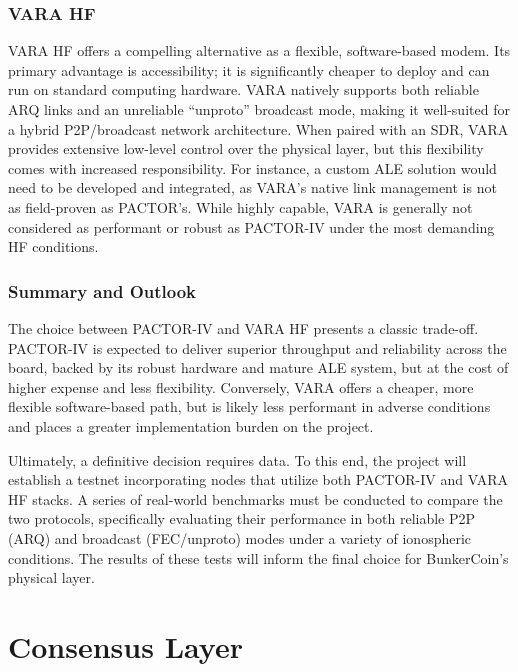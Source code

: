 \documentclass{article}
\begin{document}
\subsubsection{VARA HF}

VARA HF offers a compelling alternative as a flexible, software-based modem. Its primary advantage is accessibility; it is significantly cheaper to deploy and can run on standard computing hardware. VARA natively supports both reliable ARQ links and an unreliable ``unproto'' broadcast mode, making it well-suited for a hybrid P2P/broadcast network architecture. When paired with an SDR, VARA provides extensive low-level control over the physical layer, but this flexibility comes with increased responsibility. For instance, a custom ALE solution would need to be developed and integrated, as VARA's native link management is not as field-proven as PACTOR's. While highly capable, VARA is generally not considered as performant or robust as PACTOR-IV under the most demanding HF conditions.

\subsubsection{Summary and Outlook}
\label{sec:phys_summary}

The choice between PACTOR-IV and VARA HF presents a classic trade-off. PACTOR-IV is expected to deliver superior throughput and reliability across the board, backed by its robust hardware and mature ALE system, but at the cost of higher expense and less flexibility. Conversely, VARA offers a cheaper, more flexible software-based path, but is likely less performant in adverse conditions and places a greater implementation burden on the project.

Ultimately, a definitive decision requires data. To this end, the project will establish a testnet incorporating nodes that utilize both PACTOR-IV and VARA HF stacks. A series of real-world benchmarks must be conducted to compare the two protocols, specifically evaluating their performance in both reliable P2P (ARQ) and broadcast (FEC/unproto) modes under a variety of ionospheric conditions. The results of these tests will inform the final choice for BunkerCoin's physical layer.

\section{Consensus Layer}
\label{sec:consensus}
\end{document}
